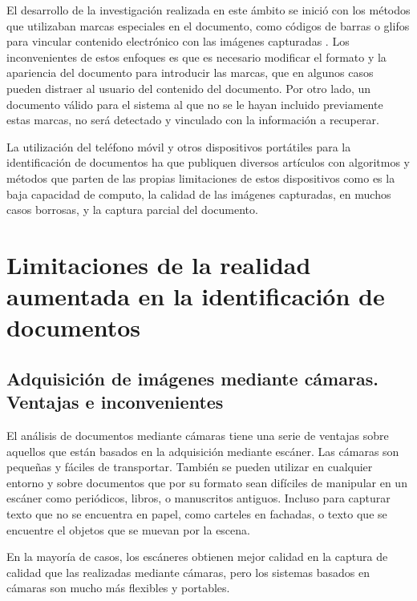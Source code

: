 El desarrollo de la investigación realizada en este ámbito se inició con los métodos que utilizaban marcas especiales en el documento, como códigos de barras \cite{Graham} o glifos para vincular contenido electrónico con las imágenes capturadas \cite{Hecht}. Los inconvenientes de estos enfoques es que es necesario modificar el formato y la apariencia del documento para introducir las marcas, que en algunos casos pueden distraer al usuario del contenido del documento. Por otro lado, un documento válido para el sistema al que no se le hayan incluido previamente estas marcas, no será detectado y vinculado con la información a recuperar.

La utilización del teléfono móvil y otros dispositivos portátiles para la identificación de documentos ha  que publiquen diversos artículos con algoritmos y métodos que parten de las propias limitaciones de estos dispositivos como es la baja capacidad de computo, la calidad de las imágenes capturadas, en muchos casos borrosas, y la captura parcial del documento.

\section{Limitaciones de la realidad aumentada en la identificación de documentos}
\subsection{Adquisición de imágenes mediante cámaras. Ventajas e inconvenientes}
El análisis de documentos mediante cámaras tiene una serie de ventajas sobre aquellos que están basados en la adquisición mediante escáner. Las cámaras son pequeñas y fáciles de transportar. También se pueden utilizar en cualquier entorno y sobre documentos que por su formato sean difíciles de manipular en un escáner como periódicos, libros, o manuscritos antiguos. Incluso para capturar texto que no se encuentra en papel, como carteles en fachadas, o texto que se encuentre el objetos que se muevan por la escena.

En la mayoría de casos, los escáneres obtienen mejor calidad en la captura de calidad que las realizadas mediante cámaras, pero los sistemas basados en cámaras son mucho más flexibles y portables. 

